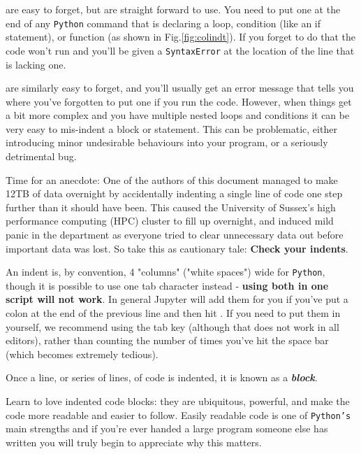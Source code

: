  are easy to forget, but are straight forward to use. You need to put one at the end of any \texttt{Python} command that is declaring a loop, condition (like an if statement), or function (as shown in Fig.\ref{fig:colindt}). If you forget to do that the code won't run and you'll be given a \texttt{SyntaxError} at the location of the line that is lacking one.
\vspace{0.1cm}

 are similarly easy to forget, and you'll usually get an error message that tells you where you've forgotten to put one if you run the code. However, when things get a bit more complex and you have multiple nested loops and conditions it can be very easy to mis-indent a block or statement. This can be problematic, either introducing minor undesirable behaviours into your program, or a seriously detrimental bug. 

\noindent Time for an anecdote: One of the authors of this document managed to make 12TB of data overnight by accidentally indenting a single line of code one step further than it should have been. This caused the University of Sussex's high performance computing (HPC) cluster to fill up overnight, and induced mild panic in the department as everyone tried to clear unnecessary data out before important data was lost. So take this as cautionary tale: \textbf{Check your indents}.
\vspace{0.25cm}

\noindent An indent is, by convention, 4 "columns" ("white spaces") wide for \texttt{Python}, though it is possible to use one tab character instead - \textbf{using both in one script will not work}. In general Jupyter will add them for you if you've put a colon at the end of the previous line and then hit \keys{\enter}. If you need to put them in yourself, we recommend  using the tab key (although that does not work in all editors), rather than counting the number of times you've hit the space bar (which becomes extremely tedious).
\vspace{0.25cm}

\noindent Once a line, or series of lines, of code is indented, it is known as a \textbf{\textit{block}}. 

\noindent Learn to love indented code blocks: they are ubiquitous, powerful, and make the code more readable and easier to follow. Easily readable code is one of \texttt{Python's} main strengths and if you're ever handed a large program someone else has written you will truly begin to appreciate why this matters.

